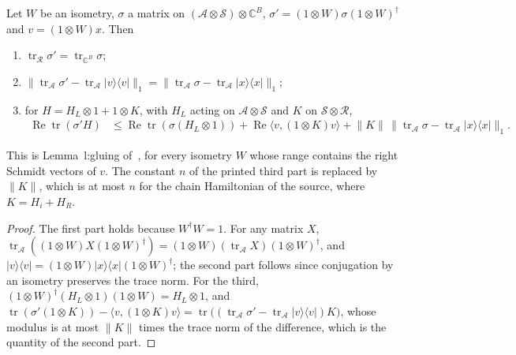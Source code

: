 \begin{theorem}[Gluing]
    \label{thm:boundary_gluing}
    \leanok
    Let $W$ be an isometry, $\sigma$ a matrix on
    $(\mathcal A\otimes\mathcal S)\otimes\mathbb C^B$,
    $\sigma'=(1\otimes W)\sigma(1\otimes W)^\dagger$ and $v=(1\otimes W)x$.
    Then
    \begin{enumerate}
        \item $\operatorname{tr}_{\mathcal R}\sigma'
                  =\operatorname{tr}_{\mathbb C^B}\sigma$;
        \item $\lVert\operatorname{tr}_{\mathcal A}\sigma'
                  -\operatorname{tr}_{\mathcal A}\lvert v\rangle\langle v\rvert\rVert_1
                  =\lVert\operatorname{tr}_{\mathcal A}\sigma
                  -\operatorname{tr}_{\mathcal A}\lvert x\rangle\langle x\rvert\rVert_1$;
        \item for $H=H_L\otimes1+1\otimes K$, with $H_L$ acting on
              $\mathcal A\otimes\mathcal S$ and $K$ on
              $\mathcal S\otimes\mathcal R$,
              \begin{align*}
                  \operatorname{Re}\operatorname{tr}(\sigma'H)
                   & \le\operatorname{Re}\operatorname{tr}(\sigma(H_L\otimes1))
                  +\operatorname{Re}\langle v,(1\otimes K)v\rangle
                  +\lVert K\rVert\,\lVert\operatorname{tr}_{\mathcal A}\sigma
                  -\operatorname{tr}_{\mathcal A}\lvert x\rangle\langle x\rvert\rVert_1.
              \end{align*}
    \end{enumerate}
    This is Lemma~l:gluing of~\cite[lines 421--447]{Landau2013PolynomialTime},
    for every isometry $W$ whose range contains the right Schmidt vectors of
    $v$. The constant $n$ of the printed third part is replaced by $\lVert K\rVert$,
    which is at most $n$ for the chain Hamiltonian of the source, where
    $K=H_i+H_R$.
\end{theorem}

\begin{proof}
    \leanok
    The first part holds because $W^\dagger W=1$. For any matrix $X$,
    $\operatorname{tr}_{\mathcal A}((1\otimes W)X(1\otimes W)^\dagger)
        =(1\otimes W)(\operatorname{tr}_{\mathcal A}X)(1\otimes W)^\dagger$, and
    $\lvert v\rangle\langle v\rvert
        =(1\otimes W)\lvert x\rangle\langle x\rvert(1\otimes W)^\dagger$; the
    second part follows since conjugation by an isometry preserves the trace
    norm. For the third, $(1\otimes W)^\dagger(H_L\otimes1)(1\otimes W)
        =H_L\otimes1$, and
    $\operatorname{tr}(\sigma'(1\otimes K))
        -\langle v,(1\otimes K)v\rangle
        =\operatorname{tr}\bigl((\operatorname{tr}_{\mathcal A}\sigma'
        -\operatorname{tr}_{\mathcal A}\lvert v\rangle\langle v\rvert)K\bigr)$,
    whose modulus is at most $\lVert K\rVert$ times the trace norm of the
    difference, which is the quantity of the second part.
\end{proof}

